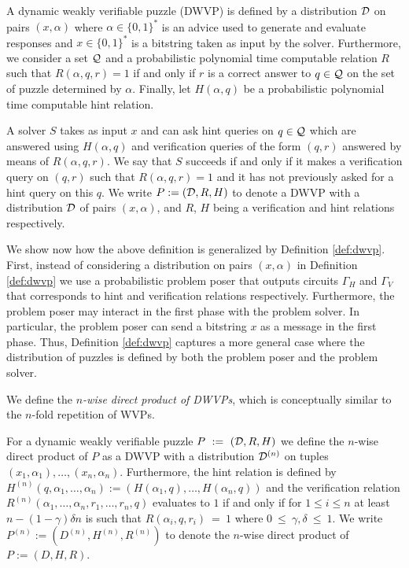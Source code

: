 \begin{definition}
  \label{def:dwvp_dodis}
  A \textnormal{dynamic weakly verifiable puzzle} (DWVP) is defined by a distribution $\mathcal{D}$ on pairs $(x, \alpha)$
  where $\alpha \in \{0,1\}^{*}$ is an advice used to generate and evaluate responses and $x \in \{0,1\}^{*}$ is
  a bitstring taken as input by the solver.
  Furthermore, we consider a set $\mathcal{Q}$ and a probabilistic polynomial time computable relation $R$ such that
  $R(\alpha, q, r) = 1$ if and only if $r$ is a correct answer to $q \in \mathcal{Q}$ on the set of puzzle determined by $\alpha$.
  Finally, let $H(\alpha, q)$ be a probabilistic polynomial time computable \textnormal{hint} relation.

  A solver $S$ takes as input $x$ and can ask hint queries on $q \in \mathcal{Q}$ which are answered using $H(\alpha, q)$ and verification
  queries of the form $(q,r)$ answered by means of $R(\alpha, q, r)$.
  We say that $S$ succeeds if and only if it makes a verification query on $(q,r)$ such that
  $R(\alpha,q,r) = 1$ and it
  has not previously asked for a hint query on this $q$. We write $P := (\mathcal{D}, R, H)$ to denote a DWVP with a distribution
  $\mathcal{D}$ of pairs $(x, \alpha)$, and $R$, $H$ being a verification and hint relations respectively.
\end{definition}
%
We show now how the above definition is generalized by Definition \ref{def:dwvp}.
First, instead of considering a distribution on pairs $(x,\alpha)$ in Definition \ref{def:dwvp}
we use a probabilistic problem poser that outputs circuits $\Gamma_H$ and $\Gamma_V$ that corresponds to hint
and verification relations respectively.
Furthermore, the problem poser may interact in the first phase with the problem solver.
In particular, the problem poser can send a bitstring $x$ as a message in the first phase.
Thus, Definition \ref{def:dwvp} captures a more general case where the distribution of
puzzles is defined by both the problem poser and the problem solver.

We define the \textit{$n$-wise direct product of DWVPs}, which is conceptually similar to the $n$-fold repetition of WVPs.
%
\begin{definition}
For a dynamic weakly verifiable puzzle $P~:=~(\mathcal{D}, R, H)$ we define the $n$-wise direct product of $P$
as a DWVP with a distribution $\mathcal{D}^{(n)}$ on tuples $(x_1, \alpha_1), \dotsc, (x_n, \alpha_n)$.
Furthermore, the hint relation is defined by $H^{(n)}(q, \alpha_1, \dotsc, \alpha_n) := (H(\alpha_1, q), \dotsc, H(\alpha_n, q))$ and
the verification relation $R^{(n)}(\alpha_1, \dotsc, \alpha_n, r_1, \dotsc, r_n, q)$ evaluates to $1$ if and only if
for $1\!\leq\!i\!\leq\!n$ at least $n - (1 - \gamma)\delta n$ is such that $R(\alpha_i, q, r_i)~=~1$ where $0~\leq~\gamma,\delta~\leq~1$.
%
We write $P^{(n)} := (D^{(n)}, H^{(n)}, R^{(n)})$ to denote the $n$-wise direct product of $P := (D,H,R)$.
%
\end{definition}

